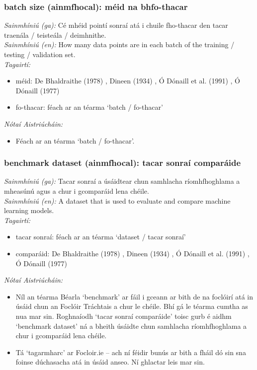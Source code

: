 \subsubsection*{batch size (ainmfhocal): méid na bhfo-thacar}
 \noindent \textit{Sainmhíniú (ga):} Cé mhéid pointí sonraí atá i chuile fho-thacar den tacar traenála / teisteála / deimhnithe.
\\
 \noindent \textit{Sainmhíniú (en):} How many data points are in each batch of the training / testing / validation set.
\\
 \noindent \textit{Tagairtí:}
\begin{itemize}
	\item méid: De Bhaldraithe (1978) \cite{de-bhaldraithe}, Dineen (1934) \cite{dineen}, Ó Dónaill et al. (1991) \cite{focloir-beag}, Ó Dónaill (1977) \cite{odonaill}
	\item fo-thacar: féach ar an téarma `batch / fo-thacar'
\end{itemize}

 \noindent \textit{Nótaí Aistriúcháin:}
\begin{itemize}
	\item Féach ar an téarma `batch / fo-thacar'.
\end{itemize}


\subsubsection*{benchmark dataset (ainmfhocal): tacar sonraí comparáide}
 \noindent \textit{Sainmhíniú (ga):} Tacar sonraí a úsáidtear chun samhlacha ríomhfhoghlama a mheasúnú agus a chur i gcomparáid lena chéile.
\\
 \noindent \textit{Sainmhíniú (en):} A dataset that is used to evaluate and compare machine learning models.
\\
 \noindent \textit{Tagairtí:}
\begin{itemize}
	\item tacar sonraí: féach ar an téarma `dataset / tacar sonraí'
	\item comparáid: De Bhaldraithe (1978) \cite{de-bhaldraithe}, Dineen (1934) \cite{dineen}, Ó Dónaill et al. (1991) \cite{focloir-beag}, Ó Dónaill (1977) \cite{odonaill}
\end{itemize}

 \noindent \textit{Nótaí Aistriúcháin:}
\begin{itemize}
	\item Níl an téarma Béarla `benchmark' ar fáil i gceann ar bith de na foclóirí atá in úsáid chun an Foclóir Tráchtais a chur le chéile. Bhí gá le téarma cumtha as nua mar sin. Roghnaíodh `tacar sonraí comparáide' toisc gurb é aidhm `benchmark dataset' ná a bheith úsáidte chun samhlacha ríomhfhoghlama a chur i gcomparáid lena chéile.
	\item Tá `tagarmharc' ar Focloir.ie -- ach ní féidir bunús ar bith a fháil dó sin sna foinse dúchasacha atá in úsáid anseo. Ní ghlactar leis mar sin.
\end{itemize}


